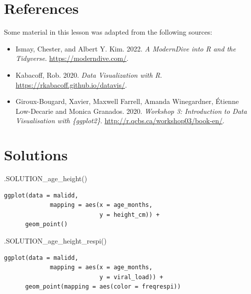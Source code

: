 \documentclass[
  letterpaper,
  DIV=11,
  numbers=noendperiod]{scrreprt}
\newenvironment{Shaded}{\begin{snugshade}}{\end{snugshade}}
\newcommand{\FunctionTok}[1]{\textcolor[rgb]{0.28,0.35,0.67}{#1}}
\newcommand{\NormalTok}[1]{\textcolor[rgb]{0.00,0.23,0.31}{#1}}
\providecommand{\tightlist}{%
  \setlength{\itemsep}{0pt}\setlength{\parskip}{0pt}}\usepackage{longtable,booktabs,array}
\begin{document}
\hypertarget{references-14}{%
\section*{References}\label{references-14}}


Some material in this lesson was adapted from the following sources:

\begin{itemize}
\tightlist
\item
  Ismay, Chester, and Albert Y. Kim. 2022. \emph{A ModernDive into R and
  the Tidyverse}. \url{https://moderndive.com/}.
\item
  Kabacoff, Rob. 2020. \emph{Data Visualization with R}.
  \url{https://rkabacoff.github.io/datavis/}.
\item
  Giroux-Bougard, Xavier, Maxwell Farrell, Amanda Winegardner, Étienne
  Low-Decarie and Monica Granados. 2020. \emph{Workshop 3: Introduction
  to Data Visualisation with \{ggplot2\}}.
  \url{http://r.qcbs.ca/workshop03/book-en/}.
\end{itemize}

\hypertarget{solutions-10}{%
\section{Solutions}\label{solutions-10}}

\begin{Shaded}
\begin{Highlighting}[]
\FunctionTok{.SOLUTION\_age\_height}\NormalTok{()}
\end{Highlighting}
\end{Shaded}

\begin{verbatim}
ggplot(data = malidd,
             mapping = aes(x = age_months, 
                           y = height_cm)) +
      geom_point()
\end{verbatim}

\begin{Shaded}
\begin{Highlighting}[]
\FunctionTok{.SOLUTION\_age\_height\_respi}\NormalTok{()}
\end{Highlighting}
\end{Shaded}

\begin{verbatim}
ggplot(data = malidd, 
             mapping = aes(x = age_months, 
                           y = viral_load)) + 
      geom_point(mapping = aes(color = freqrespi))
\end{verbatim}
\end{document}
